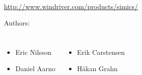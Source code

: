 \begin{frame}
  \begin{center}
    \url{http://www.windriver.com/products/simics/}
  \end{center}

  \vspace{1cm}

  Authors:

  \begin{columns}
    \begin{itemize}
    \item Eric Nilsson
    \item Daniel Aarno
    \end{itemize}
    \begin{itemize}
    \item Erik Carstensen
    \item H{\aa}kan Grahn
    \end{itemize}
  \end{columns}

\end{frame}
